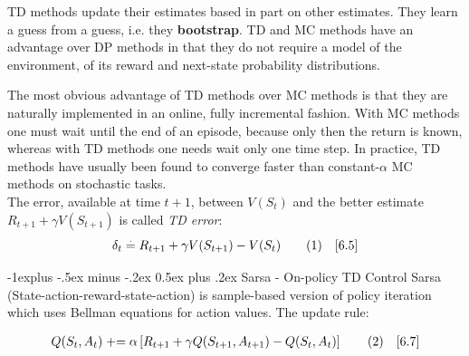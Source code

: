 \documentclass[10pt,landscape]{article}
\makeatletter
\renewcommand{\subsection}{\@startsection{subsection}{2}{0mm}%
                                {-1explus -.5ex minus -.2ex}%
                                {0.5ex plus .2ex}%
                                {\normalfont\normalsize\bfseries}}
\newcommand\numberthis{\addtocounter{equation}{1}\tag{\theequation}}
\makeatother
\begin{document}
\begin{multicols}{3}

TD methods update their estimates based in part on other estimates. They learn a guess from a guess, i.e. they \textbf{bootstrap}.
TD and MC methods have an advantage over DP methods in that they do not require a model of the environment, of its reward and next-state probability distributions.

The most obvious advantage of TD methods over MC methods is that they are naturally implemented in an online, fully incremental fashion. 
With MC methods one must wait until the end of an episode, because only then the return is known, whereas with TD methods one needs wait only one time step.
In practice, TD methods have usually been found to converge faster than constant-$\alpha$ MC methods on stochastic tasks.\\
The error, available at time $t+1$, between $V(S_t)$ and the better estimate $R_{t+1} + \gamma V(S_{t+1})$ is called \emph{TD error}:
\begin{equation*}
\delta_t \stackrel{.}{=} R_{t+1} + \gamma V(S_{t+1}) - V(S_t) \numberthis  \quad [6.5]
\end{equation*}

\subsection{Sarsa - On-policy TD Control}
Sarsa (State-action-reward-state-action) is sample-based version of policy iteration which uses Bellman equations for action values. 
The update rule:

\begin{align*}
    Q(S_t, A_t) \mathrel{+}=  \alpha \left[R_{t+1} + \gamma Q(S_{t+1}, A_{t+1}) - Q(S_t, A_t) \right] \numberthis  \quad [6.7]
\end{align*}


\end{multicols}
\end{document}
